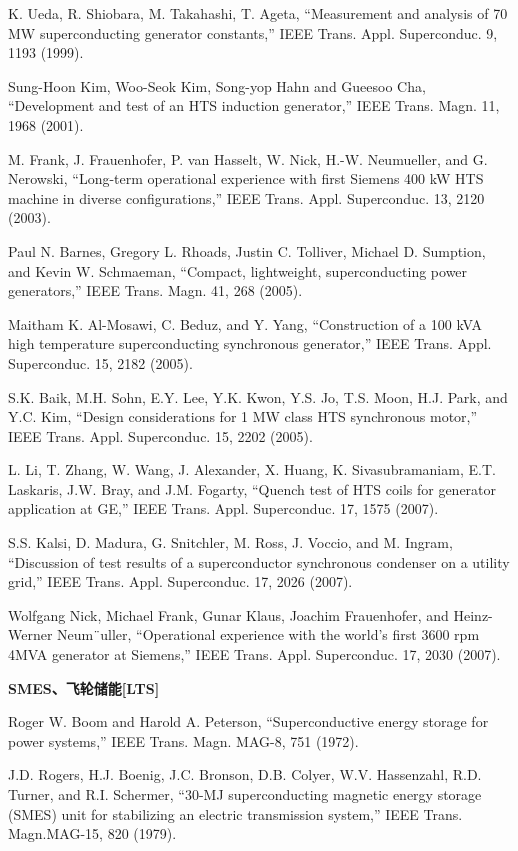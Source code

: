 \noindent [9.66] K. Ueda, R. Shiobara, M. Takahashi, T. Ageta, ``Measurement and analysis of 70
MW superconducting generator constants,” IEEE Trans. Appl. Superconduc. 9,
1193 (1999).

\noindent [9.67] Sung-Hoon Kim, Woo-Seok Kim, Song-yop Hahn and Gueesoo Cha, ``Development
and test of an HTS induction generator,” IEEE Trans. Magn. 11, 1968 (2001).

\noindent [9.68] M. Frank, J. Frauenhofer, P. van Hasselt, W. Nick, H.-W. Neumueller, and G. Nerowski,
``Long-term operational experience with first Siemens 400 kW HTS machine
in diverse configurations,” IEEE Trans. Appl. Superconduc. 13, 2120 (2003).

\noindent [9.69] Paul N. Barnes, Gregory L. Rhoads, Justin C. Tolliver, Michael D. Sumption,
and Kevin W. Schmaeman, ``Compact, lightweight, superconducting power generators,”
IEEE Trans. Magn. 41, 268 (2005).

\noindent [9.70] Maitham K. Al-Mosawi, C. Beduz, and Y. Yang, ``Construction of a 100 kVA high
temperature superconducting synchronous generator,” IEEE Trans. Appl. Superconduc.
15, 2182 (2005).

\noindent [9.71] S.K. Baik, M.H. Sohn, E.Y. Lee, Y.K. Kwon, Y.S. Jo, T.S. Moon, H.J. Park, and
Y.C. Kim, ``Design considerations for 1 MW class HTS synchronous motor,” IEEE
Trans. Appl. Superconduc. 15, 2202 (2005).

\noindent [9.72] L. Li, T. Zhang, W. Wang, J. Alexander, X. Huang, K. Sivasubramaniam, E.T.
Laskaris, J.W. Bray, and J.M. Fogarty, ``Quench test of HTS coils for generator
application at GE,” IEEE Trans. Appl. Superconduc. 17, 1575 (2007).

\noindent [9.73] S.S. Kalsi, D. Madura, G. Snitchler, M. Ross, J. Voccio, and M. Ingram, ``Discussion
of test results of a superconductor synchronous condenser on a utility grid,”
IEEE Trans. Appl. Superconduc. 17, 2026 (2007).

\noindent [9.74] Wolfgang Nick, Michael Frank, Gunar Klaus, Joachim Frauenhofer, and Heinz-
Werner Neum¨uller, ``Operational experience with the world’s first 3600 rpm 4MVA
generator at Siemens,” IEEE Trans. Appl. Superconduc. 17, 2030 (2007).

\noindent \textbf{SMES、飞轮储能[LTS] }

\noindent [9.75] Roger W. Boom and Harold A. Peterson, ``Superconductive energy storage for
power systems,” IEEE Trans. Magn. MAG-8, 751 (1972).

\noindent [9.76] J.D. Rogers, H.J. Boenig, J.C. Bronson, D.B. Colyer, W.V. Hassenzahl, R.D. Turner, and R.I. Schermer, ``30-MJ superconducting magnetic energy storage (SMES)
unit for stabilizing an electric transmission system,” IEEE Trans. Magn.MAG-15,
820 (1979).

